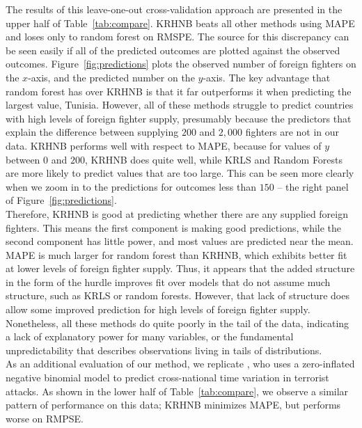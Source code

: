 \documentclass[12pt]{article}
\begin{document}
The results of this leave-one-out cross-validation approach are presented in the upper half of Table~\ref{tab:compare}. KRHNB beats all other methods using MAPE and loses only to random forest on RMSPE. The source for this discrepancy can be seen easily if all of the predicted outcomes are plotted against the observed outcomes. Figure~\ref{fig:predictions} plots the observed number of foreign fighters on the $x$-axis, and the predicted number on the $y$-axis. The key advantage that random forest has over KRHNB is that it far outperforms it when predicting the largest value, Tunisia. However, all of these methods struggle to predict countries with high levels of foreign fighter supply, presumably because the predictors that explain the difference between supplying $200$ and $2,000$ fighters are not in our data. KRHNB performs well with respect to MAPE, because for values of $y$ between $0$ and $200$, KRHNB does quite well, while KRLS and Random Forests are more likely to predict values that are too large. This can be seen more clearly when we zoom in to the predictions for outcomes less than $150$ -- the right panel of Figure~\ref{fig:predictions}. 	\\

Therefore, KRHNB is good at predicting whether there are any supplied foreign fighters. This means the first component is making good predictions, while the second component has little power, and most values are predicted near the mean. MAPE is much larger for random forest than KRHNB, which exhibits better fit at lower levels of foreign fighter supply. Thus, it appears that the added structure in the form of the hurdle improves fit over models that do not assume much structure, such as KRLS or random forests. However, that lack of structure does allow some improved prediction for high levels of foreign fighter supply. Nonetheless, all these methods do quite poorly in the tail of the data, indicating a lack of explanatory power for many variables, or the fundamental unpredictability that describes observations living in tails of distributions. \\

As an additional evaluation of our method, we replicate \cite{Burgoon2006}, who uses a zero-inflated negative binomial model to predict cross-national time variation in terrorist attacks. As shown in the lower half of Table~\ref{tab:compare}, we observe a similar pattern of performance on this data; KRHNB minimizes MAPE, but performs worse on RMPSE. \\
\end{document}

